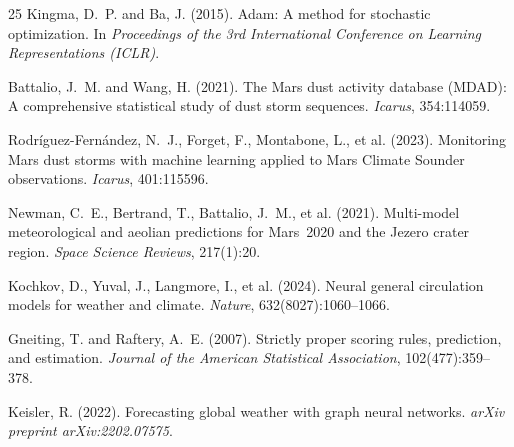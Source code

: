 \documentclass[11pt, a4paper, twocolumn]{article}
\begin{document}
\begin{thebibliography}{25}
Kingma, D.~P. and Ba, J. (2015).
\newblock Adam: A method for stochastic optimization.
\newblock In \textit{Proceedings of the 3rd International Conference on Learning Representations (ICLR)}.

Battalio, J.~M. and Wang, H. (2021).
\newblock The {M}ars dust activity database ({MDAD}): A comprehensive statistical study of dust storm sequences.
\newblock \textit{Icarus}, 354:114059.

Rodr\'{i}guez-Fern\'{a}ndez, N.~J., Forget, F., Montabone, L., et al. (2023).
\newblock Monitoring {M}ars dust storms with machine learning applied to Mars Climate Sounder observations.
\newblock \textit{Icarus}, 401:115596.

Newman, C.~E., Bertrand, T., Battalio, J.~M., et al. (2021).
\newblock Multi-model meteorological and aeolian predictions for {M}ars~2020 and the {J}ezero crater region.
\newblock \textit{Space Science Reviews}, 217(1):20.

Kochkov, D., Yuval, J., Langmore, I., et al. (2024).
\newblock Neural general circulation models for weather and climate.
\newblock \textit{Nature}, 632(8027):1060--1066.

Gneiting, T. and Raftery, A.~E. (2007).
\newblock Strictly proper scoring rules, prediction, and estimation.
\newblock \textit{Journal of the American Statistical Association}, 102(477):359--378.

Keisler, R. (2022).
\newblock Forecasting global weather with graph neural networks.
\newblock \textit{arXiv preprint arXiv:2202.07575}.

\end{thebibliography}
\end{document}
